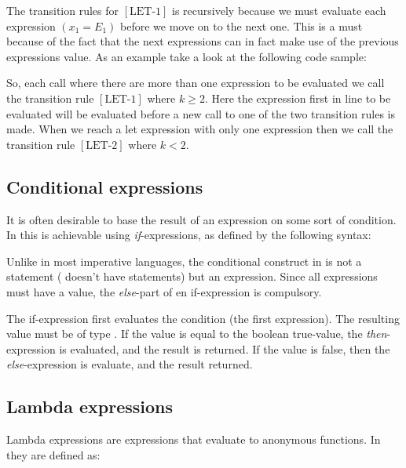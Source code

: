 The transition rules for $[\mbox{LET-1}]$ is recursively because we must
evaluate each expression $(x_{1}=E_{1})$ before we move on to the next one. This
is a must because of the fact that the next expressions can in fact make use of
the previous expressions value. As an example take a look at the following code
sample:


So, each call where there are more than one expression to be evaluated we call
the transition rule $[\mbox{LET-1}]$ where $k \geq 2$. Here the expression first
in line to be evaluated will be evaluated before a new call to one of the two
transition rules is made. When we reach a let expression with only one
expression then we call the transition rule $[\mbox{LET-2}]$ where $k < 2$.

\subsection{Conditional expressions}
\label{sec:conditionalexpressions}

It is often desirable to base the result of an expression on some sort of condition.
In \productname{} this is achievable using \emph{if}-expressions, as defined by the
following syntax:

\begin{ebnf}
\end{ebnf}

Unlike in most imperative languages, the conditional construct in \productname{}
is not a statement (\productname{} doesn't have statements) but an expression.
Since all expressions must have a value, the \emph{else}-part of en
if-expression is compulsory.

The if-expression first evaluates the condition (the first expression). The
resulting value must be of type . If the value is equal to the
boolean true-value, the \emph{then}-expression is evaluated, and the result is
returned. If the value is false, then the \emph{else}-expression is evaluate,
and the result returned.

\subsection{Lambda expressions}

Lambda expressions are expressions that evaluate to anonymous functions. In
\productname{} they are defined as:

